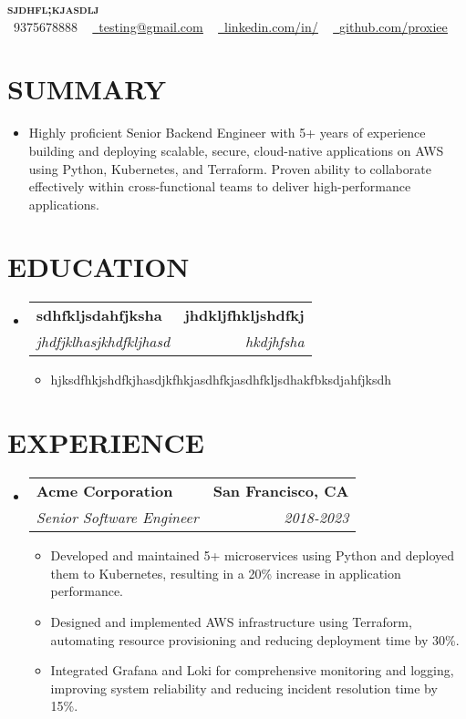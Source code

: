\documentclass[letterpaper,11pt]{article}
\makeatletter
\newcommand{\resumeItem}[1]{\item\small{{#1 \vspace{-3pt}}}}
\newcommand{\resumeSubheading}[4]{\vspace{-2pt}\item\begin{tabular*}{0.97\textwidth}[t]{l@{\extracolsep{\fill}}r}\textbf{#1} & #2 \\\textit{\small#3} & \textit{\small #4} \\\end{tabular*}\vspace{-7pt}}
\newcommand{\resumeSubHeadingListStart}{\begin{itemize}[leftmargin=0.15in, label={}]}
\newcommand{\resumeSubHeadingListEnd}{\end{itemize}}
\newcommand{\resumeItemListStart}{\begin{itemize}}
\newcommand{\resumeItemListEnd}{\end{itemize}\vspace{-5pt}}
\makeatother
\begin{document}
\begin{center}
    \textbf{\Huge \scshape {\fontsize{15pt}{20pt}\selectfont sjdhfl;kjasdlj}} \\ \vspace{1pt}
    \small \raisebox{-0.1\height}\faPhone\ 9375678888 ~ \href{mailto:testing@gmail.com}{\raisebox{-0.2\height}\faEnvelope\  \underline{testing@gmail.com}} ~ 
    \href{https://www.linkedin.com/feed/}{\raisebox{-0.2\height}\faLinkedin\ \underline{linkedin.com/in/}} ~ 
    \href{https://github.com/proxiee}{\raisebox{-0.2\height}\faGithub\ \underline{github.com/proxiee}}
    \vspace{-8pt}
\end{center}

\section{{\fontsize{9pt}{20pt}\selectfont \textbf{SUMMARY}}}\resumeSubHeadingListStart
\resumeItem{Highly proficient Senior Backend Engineer with 5+ years of experience building and deploying scalable, secure, cloud-native applications on AWS using Python, Kubernetes, and Terraform.  Proven ability to collaborate effectively within cross-functional teams to deliver high-performance applications.}
\resumeSubHeadingListEnd\vspace{-18pt}
\section{{\fontsize{9pt}{20pt}\selectfont \textbf{EDUCATION}}}\resumeSubHeadingListStart
\resumeSubheading{sdhfkljsdahfjksha}{\textbf{jhdkljfhkljshdfkj}}{jhdfjklhasjkhdfkljhasd}{hkdjhfsha}
\resumeItemListStart
\resumeItem{hjksdfhkjshdfkjhasdjkfhkjasdhfkjasdhfkljsdhakfbksdjahfjksdh}
\resumeItemListEnd
\resumeSubHeadingListEnd\vspace{-18pt}
\section{{\fontsize{9pt}{20pt}\selectfont \textbf{EXPERIENCE}}}\resumeSubHeadingListStart
\resumeSubheading{Acme Corporation}{\textbf{San Francisco, CA}}{Senior Software Engineer}{2018-2023}
\resumeItemListStart
\resumeItem{Developed and maintained 5+ microservices using Python and deployed them to Kubernetes, resulting in a 20\% increase in application performance.}
\resumeItem{Designed and implemented AWS infrastructure using Terraform, automating resource provisioning and reducing deployment time by 30\%.}
\resumeItem{Integrated Grafana and Loki for comprehensive monitoring and logging, improving system reliability and reducing incident resolution time by 15\%.}
\resumeItemListEnd
\resumeSubHeadingListEnd\vspace{-17pt}
\end{document}
